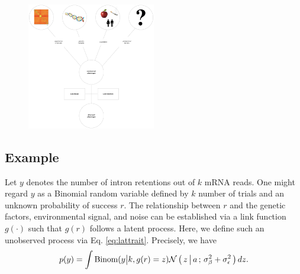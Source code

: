 \begin{figure}[ht]\label{fig:gm}
  \centering
  \includegraphics[width=0.5\textwidth]{images/friendly-model.png}
\end{figure}

\subsection{Example}

Let $y$ denotes the number of intron retentions out of $k$ mRNA reads.
One might regard $y$ as a Binomial random variable defined by $k$ number of
trials and an unknown probability of success $r$.
The relationship between $r$ and the genetic factors, environmental signal,
and noise can be established via a link function $g(\cdot)$ such that
$g(r)$ follows a latent process.
Here, we define such an unobserved process via Eq. \eqref{eq:lattrait}.
Precisely, we have
\begin{align*}
  p(y) = \int \text{Binom}( {y} \big| {k}, {g(r) = z} ) \mathcal{N}\left(\, { {z} \, \big| \, {a} } \,;\, { {\sigma^2_\beta + \sigma^2_\epsilon} } \,\right) dz.
\end{align*}
